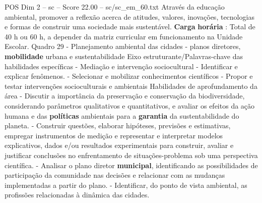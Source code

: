 \begin{textsample}{POS Dim 2 – sc – Score 22.00 – sc/sc\_em\_60.txt}
Através da educação ambiental, promover a reflexão acerca de atitudes, valores, inovações, tecnologias e formas de construir uma sociedade mais sustentável. \textbf{Carga} \textbf{horária} : Total de 40 h ou 60 h, a depender da matriz curricular em funcionamento na Unidade Escolar.
Quadro 29 - Planejamento ambiental das cidades - planos diretores, \textbf{mobilidade} urbana e sustentabilidade Eixo estruturante/Palavras-chave das habilidades específicas - Mediação e intervenção sociocultural - Identificar e explicar fenômenos. - Selecionar e mobilizar conhecimentos científicos - Propor e testar intervenções socioculturais e ambientais Habilidades de aprofundamento da área - Discutir a importância da preservação e conservação da biodiversidade, considerando parâmetros qualitativos e quantitativos, e avaliar os efeitos da ação humana e das \textbf{políticas} ambientais para a \textbf{garantia} da sustentabilidade do planeta. - Construir questões, elaborar hipóteses, previsões e estimativas, empregar instrumentos de medição e representar e interpretar modelos explicativos, dados e/ou resultados experimentais para construir, avaliar e justificar conclusões no enfrentamento de situações-problema sob uma perspectiva científica. - Analisar o plano diretor \textbf{municipal}, identificando as possibilidades de participação da comunidade nas decisões e relacionar com as mudanças implementadas a partir do plano. - Identificar, do ponto de vista ambiental, as profissões relacionadas à dinâmica das cidades.

\end{textsample}
